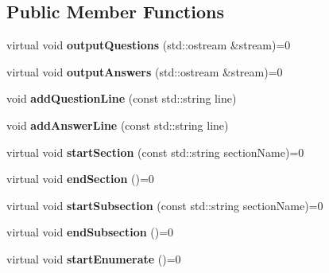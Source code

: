 \subsection*{Public Member Functions}
\begin{DoxyCompactItemize}
\item 
virtual void {\bfseries output\+Questions} (std\+::ostream \&stream)=0\hypertarget{classFormatter_a98ff09fa6b041b352b11f52d314b0410}{}\label{classFormatter_a98ff09fa6b041b352b11f52d314b0410}

\item 
virtual void {\bfseries output\+Answers} (std\+::ostream \&stream)=0\hypertarget{classFormatter_a0fdcbe54f426fe453161682200e9bf48}{}\label{classFormatter_a0fdcbe54f426fe453161682200e9bf48}

\item 
void {\bfseries add\+Question\+Line} (const std\+::string line)\hypertarget{classFormatter_aba80ae3dd4e98f9e277977ef7ef61774}{}\label{classFormatter_aba80ae3dd4e98f9e277977ef7ef61774}

\item 
void {\bfseries add\+Answer\+Line} (const std\+::string line)\hypertarget{classFormatter_adebd4aa432d008191ef03b475a267056}{}\label{classFormatter_adebd4aa432d008191ef03b475a267056}

\item 
virtual void {\bfseries start\+Section} (const std\+::string section\+Name)=0\hypertarget{classFormatter_afadeabc0c5b4b6bd048ef3f730a695ca}{}\label{classFormatter_afadeabc0c5b4b6bd048ef3f730a695ca}

\item 
virtual void {\bfseries end\+Section} ()=0\hypertarget{classFormatter_a2004debe52f66791be806d07e701bbc4}{}\label{classFormatter_a2004debe52f66791be806d07e701bbc4}

\item 
virtual void {\bfseries start\+Subsection} (const std\+::string section\+Name)=0\hypertarget{classFormatter_a8a6e1379a7d2ecb4e44901afc08a5323}{}\label{classFormatter_a8a6e1379a7d2ecb4e44901afc08a5323}

\item 
virtual void {\bfseries end\+Subsection} ()=0\hypertarget{classFormatter_ae91cf6f493111f5bc6fc9ffbf6d4e6f2}{}\label{classFormatter_ae91cf6f493111f5bc6fc9ffbf6d4e6f2}

\item 
virtual void {\bfseries start\+Enumerate} ()=0\hypertarget{classFormatter_aba4c98ea2a0a7613bd15bd279a7509e5}{}\label{classFormatter_aba4c98ea2a0a7613bd15bd279a7509e5}


\end{DoxyCompactItemize}

